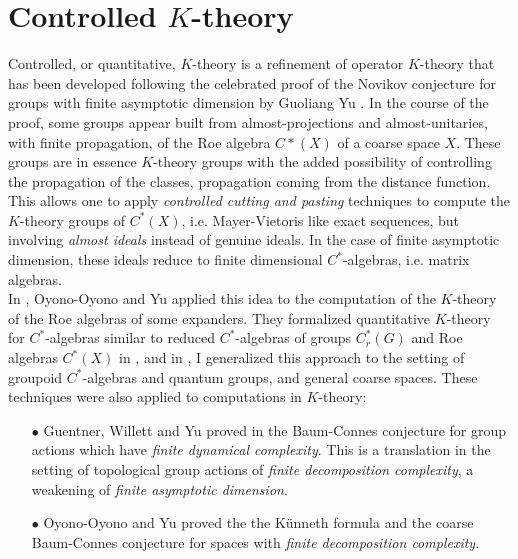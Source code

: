 \section{Controlled $K$-theory}

Controlled, or quantitative, $K$-theory is a refinement of operator $K$-theory that has been developed following the celebrated proof of the Novikov conjecture for groups with finite asymptotic dimension by Guoliang Yu \cite{Yu1}. In the course of the proof, some groups appear built from almost-projections and almost-unitaries, with finite propagation, of the Roe algebra $C*(X)$ of a coarse space $X$. These groups are in essence $K$-theory groups with the added possibility of controlling the propagation of the classes, propagation coming from the distance function. This allows one to apply \textit{controlled cutting and pasting} techniques to compute the $K$-theory groups of $C^*(X)$, i.e. Mayer-Vietoris like exact sequences, but involving \textit{almost ideals} instead of genuine ideals. In the case of finite asymptotic dimension, these ideals reduce to finite dimensional $C^*$-algebras, i.e. matrix algebras.\\

In \cite{OY1}, Oyono-Oyono and Yu applied this idea to the computation of the $K$-theory of the Roe algebras of some expanders. They formalized quantitative $K$-theory for $C^*$-algebras similar to reduced $C^*$-algebras of groups $C^*_r(G)$ and Roe algebras $C^*(X)$ in \cite{OY2}, and in \cite{dell2018controlled}, I generalized this approach to the setting of groupoid $C^*$-algebras and quantum groups, and general coarse spaces. These techniques were also applied to computations in $K$-theory:\\
\begin{itemize} 
\item[$\bullet$] Guentner, Willett and Yu proved in \cite{GWY2} the Baum-Connes conjecture for group actions which have \textit{finite dynamical complexity}. This is a translation in the setting of topological group actions of \textit{finite decomposition complexity}, a weakening of \textit{finite asymptotic dimension}.\\   
\item[$\bullet$] Oyono-Oyono and Yu proved the the K\"unneth formula \cite{oyono2019quantitative} and the coarse Baum-Connes conjecture \cite{} for spaces with \textit{finite decomposition complexity}.\\
\end{itemize}

